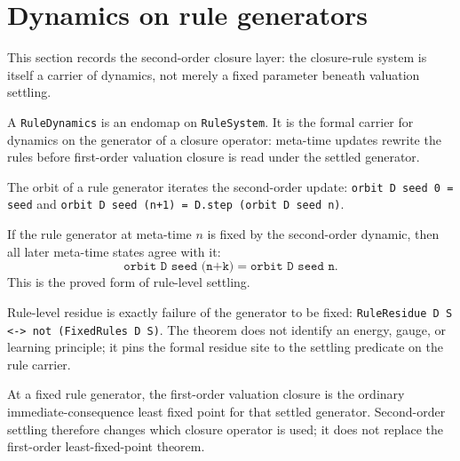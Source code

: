 \section{Dynamics on rule generators}

This section records the second-order closure layer: the closure-rule system is
itself a carrier of dynamics, not merely a fixed parameter beneath valuation
settling.

\begin{proposition}\label{thm:rule-dynamics}\leanok{}
A \texttt{RuleDynamics} is an endomap on \texttt{RuleSystem}. It is the formal
carrier for dynamics on the generator of a closure operator: meta-time updates
rewrite the rules before first-order valuation closure is read under the settled
generator.
\end{proposition}

\begin{proposition}\label{thm:rule-dynamics-orbit}\leanok{}
The orbit of a rule generator iterates the second-order update:
\texttt{orbit D seed 0 = seed} and
\texttt{orbit D seed (n+1) = D.step (orbit D seed n)}.
\end{proposition}

\begin{theorem}\label{thm:fixed-rule-orbit-add}\leanok{}
If the rule generator at meta-time $n$ is fixed by the second-order dynamic, then
all later meta-time states agree with it:
\[
  \texttt{orbit D seed (n+k)} = \texttt{orbit D seed n}.
\]
This is the proved form of rule-level settling.
\end{theorem}

\begin{theorem}\label{thm:rule-residue-iff-not-fixed}\leanok{}
Rule-level residue is exactly failure of the generator to be fixed:
\texttt{RuleResidue D S <-> not (FixedRules D S)}. The theorem does not identify
an energy, gauge, or learning principle; it pins the formal residue site to the
settling predicate on the rule carrier.
\end{theorem}

\begin{theorem}\label{thm:settled-rules-closure-lfp}\leanok{}
At a fixed rule generator, the first-order valuation closure is the ordinary
immediate-consequence least fixed point for that settled generator. Second-order
settling therefore changes which closure operator is used; it does not replace
the first-order least-fixed-point theorem.
\end{theorem}

